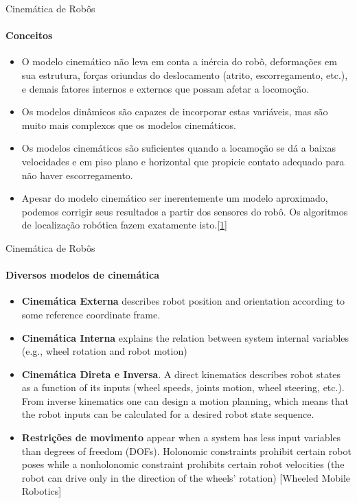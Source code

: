 \documentclass{beamer}
\begin{document}
\begin{frame}{Cinemática de Robôs}
    \framesubtitle{Conceitos}
    \begin{itemize}
        \item O modelo cinemático não leva em conta a inércia do robô, deformações em
        sua estrutura, forças oriundas do deslocamento (atrito, escorregamento, etc.),
        e demais fatores internos e externos que possam afetar a locomoção.
        \item Os modelos dinâmicos são capazes de incorporar estas variáveis, mas são
        muito mais complexos que os modelos cinemáticos.
        \item Os modelos cinemáticos são suficientes quando a locamoção se dá a baixas
        velocidades e em piso plano e horizontal que propicie contato adequado para
        não haver escorregamento.
        \item Apesar do modelo cinemático ser inerentemente um modelo aproximado,
        podemos corrigir seus resultados a partir dos sensores do robô. Os algoritmos
        de localização robótica fazem exatamente isto.\href{http://143.106.148.168:9080/Cursos/IA368N/01-16/cinematica2.pdf}{[1]}
    \end{itemize}
\end{frame}

\begin{frame}{Cinemática de Robôs}
    \framesubtitle{Diversos modelos de cinemática}
    \begin{itemize}
        \item \textbf{Cinemática Externa} describes robot position and orientation according to
some reference coordinate frame.
        \item \textbf{Cinemática Interna} explains the relation between system internal variables
(e.g., wheel rotation and robot motion)
        \item \textbf{Cinemática Direta e Inversa}. A direct kinematics describes
robot states as a function of its inputs (wheel speeds, joints motion,
wheel steering, etc.). From inverse kinematics one can design a motion
planning, which means that the robot inputs can be calculated for a
desired robot state sequence.
        \item \textbf{Restrições de movimento} appear when a system has less input variables than
degrees of freedom (DOFs). Holonomic constraints prohibit certain
robot poses while a nonholonomic constraint prohibits certain robot
velocities (the robot can drive only in the direction of the wheels’
rotation) [Wheeled Mobile Robotics]
    \end{itemize}
\end{frame}
\end{document}
